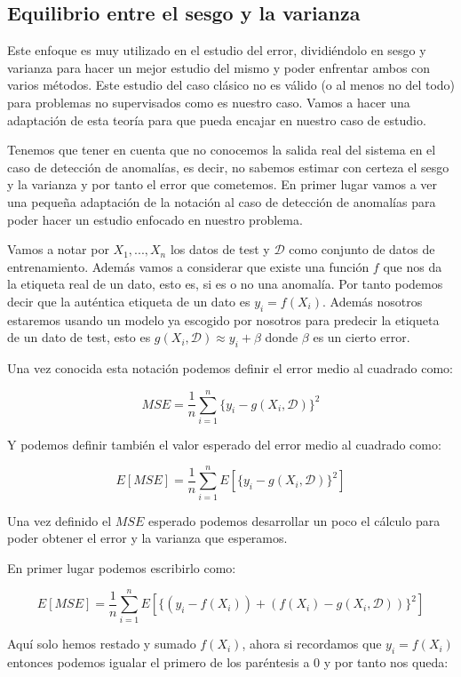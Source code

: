 \subsection{Equilibrio entre el sesgo y la varianza}

Este enfoque es muy utilizado en el estudio del error, dividiéndolo en sesgo y varianza para hacer un mejor estudio del mismo y poder enfrentar ambos con varios métodos. Este estudio del caso clásico no es válido (o al menos no del todo) para problemas no supervisados como es nuestro caso. Vamos a hacer una adaptación de esta teoría para que pueda encajar en nuestro caso de estudio.

Tenemos que tener en cuenta que no conocemos la salida real del sistema en el caso de detección de anomalías, es decir, no sabemos estimar con certeza el sesgo y la varianza y por tanto el error que cometemos. En primer lugar vamos a ver una pequeña adaptación de la notación al caso de detección de anomalías para poder hacer un estudio enfocado en nuestro problema.

Vamos a notar por $X_1 , ... , X_n$ los datos de test y $\mathcal{D}$ como conjunto de datos de entrenamiento. Además vamos a considerar que existe una función $f$ que nos da la etiqueta real de un dato, esto es, si es o no una anomalía. Por tanto podemos decir que la auténtica etiqueta de un dato es $y_i = f(X_i)$. Además nosotros estaremos usando un modelo ya escogido por nosotros para predecir la etiqueta de un dato de test, esto es $g(X_i, \mathcal{D})\approx y_i+\beta$ donde $\beta$ es un cierto error.

Una vez conocida esta notación podemos definir el error medio al cuadrado como:

$$MSE = \frac{1}{n}\sum_{i=1}^{n}\{y_i - g(X_i, \mathcal{D})\}^2$$

Y podemos definir también el valor esperado del error medio al cuadrado como:

$$E[MSE] = \frac{1}{n} \sum_{i=1}^{n}E[\{y_i - g(X_i, \mathcal{D})\}^2]$$

Una vez definido el $MSE$ esperado podemos desarrollar un poco el cálculo para poder obtener el error y la varianza que esperamos.

En primer lugar podemos escribirlo como:

$$E[MSE] = \frac{1}{n}\sum_{i=1}^{n}E[\{ (y_i-f(X_i)) + (f(X_i) - g(X_i,\mathcal{D})) \}^2]$$

Aquí solo hemos restado y sumado $f(X_i)$, ahora si recordamos que $y_i = f(X_i)$ entonces podemos igualar el primero de los paréntesis a $0$ y por tanto nos queda:


